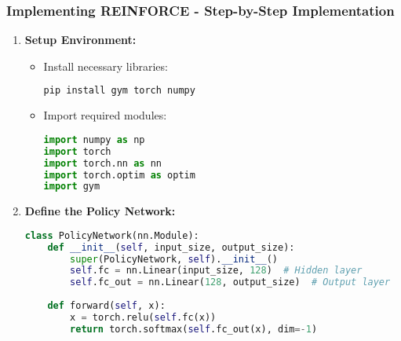 \documentclass{beamer}
\begin{document}
\begin{frame}[fragile]
    \frametitle{Implementing REINFORCE - Step-by-Step Implementation}
    \begin{enumerate}
        \item \textbf{Setup Environment:}
        \begin{itemize}
            \item Install necessary libraries:
            \begin{lstlisting}[language=bash]
pip install gym torch numpy
            \end{lstlisting}
            \item Import required modules:
            \begin{lstlisting}[language=Python]
import numpy as np
import torch
import torch.nn as nn
import torch.optim as optim
import gym
            \end{lstlisting}
        \end{itemize}
        
        \item \textbf{Define the Policy Network:}
        \begin{lstlisting}[language=Python]
class PolicyNetwork(nn.Module):
    def __init__(self, input_size, output_size):
        super(PolicyNetwork, self).__init__()
        self.fc = nn.Linear(input_size, 128)  # Hidden layer
        self.fc_out = nn.Linear(128, output_size)  # Output layer
    
    def forward(self, x):
        x = torch.relu(self.fc(x))
        return torch.softmax(self.fc_out(x), dim=-1)
        \end{lstlisting}
    \end{enumerate}
\end{frame}
\end{document}
